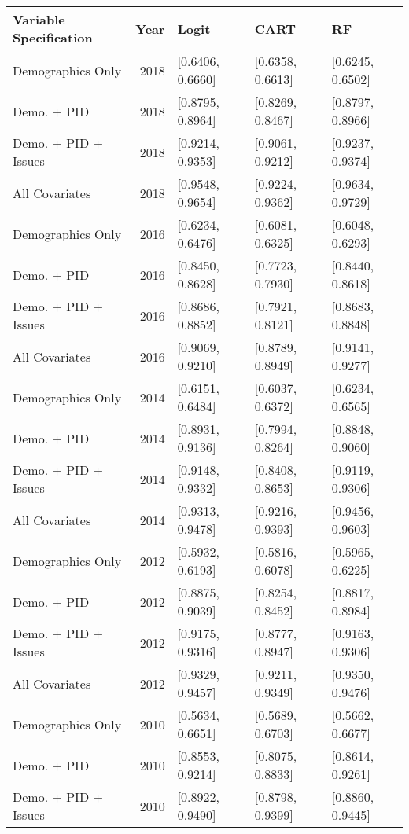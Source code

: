 \begin{longtable}{lrlll}
  \toprule
Variable Specification & Year & Logit & CART & RF \\ 
  \midrule
Demographics Only & 2018 & [0.6406, 0.6660] & [0.6358, 0.6613] & [0.6245, 0.6502] \\ 
  Demo. + PID & 2018 & [0.8795, 0.8964] & [0.8269, 0.8467] & [0.8797, 0.8966] \\ 
  Demo. + PID + Issues & 2018 & [0.9214, 0.9353] & [0.9061, 0.9212] & [0.9237, 0.9374] \\ 
  All Covariates & 2018 & [0.9548, 0.9654] & [0.9224, 0.9362] & [0.9634, 0.9729] \\ 
  Demographics Only & 2016 & [0.6234, 0.6476] & [0.6081, 0.6325] & [0.6048, 0.6293] \\ 
  Demo. + PID & 2016 & [0.8450, 0.8628] & [0.7723, 0.7930] & [0.8440, 0.8618] \\ 
  Demo. + PID + Issues & 2016 & [0.8686, 0.8852] & [0.7921, 0.8121] & [0.8683, 0.8848] \\ 
  All Covariates & 2016 & [0.9069, 0.9210] & [0.8789, 0.8949] & [0.9141, 0.9277] \\ 
  Demographics Only & 2014 & [0.6151, 0.6484] & [0.6037, 0.6372] & [0.6234, 0.6565] \\ 
  Demo. + PID & 2014 & [0.8931, 0.9136] & [0.7994, 0.8264] & [0.8848, 0.9060] \\ 
  Demo. + PID + Issues & 2014 & [0.9148, 0.9332] & [0.8408, 0.8653] & [0.9119, 0.9306] \\ 
  All Covariates & 2014 & [0.9313, 0.9478] & [0.9216, 0.9393] & [0.9456, 0.9603] \\ 
  Demographics Only & 2012 & [0.5932, 0.6193] & [0.5816, 0.6078] & [0.5965, 0.6225] \\ 
  Demo. + PID & 2012 & [0.8875, 0.9039] & [0.8254, 0.8452] & [0.8817, 0.8984] \\ 
  Demo. + PID + Issues & 2012 & [0.9175, 0.9316] & [0.8777, 0.8947] & [0.9163, 0.9306] \\ 
  All Covariates & 2012 & [0.9329, 0.9457] & [0.9211, 0.9349] & [0.9350, 0.9476] \\ 
  Demographics Only & 2010 & [0.5634, 0.6651] & [0.5689, 0.6703] & [0.5662, 0.6677] \\ 
  Demo. + PID & 2010 & [0.8553, 0.9214] & [0.8075, 0.8833] & [0.8614, 0.9261] \\ 
  Demo. + PID + Issues & 2010 & [0.8922, 0.9490] & [0.8798, 0.9399] & [0.8860, 0.9445] \\ 

\end{longtable}
